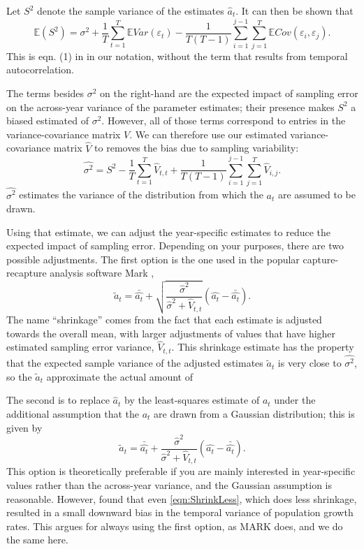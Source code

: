 \documentclass[11pt]{article}
\newcommand{\be}{\begin{equation}}
\newcommand{\ee}{\end{equation}}
\begin{document}
{Let $S^2$ denote the sample variance of the estimates $\hat{a}_t$. It can then be shown that 
\be
\mathbb{E}(S^2) = \sigma^2  + \frac{1}{T}\sum\limits_{t=1}^T \mathbb{E} Var(\varepsilon_t) 
- \frac{1}{T(T-1)}\sum\limits_{i=1}^{j-1} \sum\limits_{j=1}^T \mathbb{E}Cov(\varepsilon_i, \varepsilon_j). 
\label{eqn:biasTerms}
\ee
This is eqn. (1) in \citet{gould-nichols-1998} in our notation, without the term that 
results from temporal autocorrelation. 

The terms besides $\sigma^2$ on the right-hand are the expected impact of sampling error on the across-year variance
of the parameter estimates; their presence makes $S^2$ a biased estimated of $\sigma^2$. However,
all of those terms correspond to entries in the variance-covariance matrix $V$. We can therefore use our estimated
variance-covariance matrix $\hat{V}$ to removes the bias due to sampling variability: 
\be
\hat{\sigma^2}  = S^2 - \frac{1}{T}\sum\limits_{t=1}^T \hat{V}_{t,t} + 
\frac{1}{T(T-1)}\sum\limits_{i=1}^{j-1} \sum\limits_{j=1}^T \hat{V}_{i,j}. 
\label{eqn:hatSigma}
\ee
$\hat{\sigma^2}$ estimates the variance of the distribution from which the $a_t$ are assumed
to be drawn. 

Using that estimate, we can adjust the year-specific estimates to reduce the expected 
impact of sampling error. Depending on your purposes, there are two possible adjustments. 
The first option is the one used in the popular capture-recapture analysis 
software Mark \citet{cooch-white-2020}, 
\be
\widetilde{a}_t = \bar{\hat{a_t}} + \sqrt{\frac{\hat{\sigma}^2}{\hat{\sigma}^2 + \hat{V}_{t,t}}}\left (\hat{a_t} - \bar{\hat{a_t}} \right). 
\label{eqn:ShrinkLess}
\ee
The name ``shrinkage'' comes from the fact that each estimate is adjusted towards the overall mean, with 
larger adjustments of values that have higher estimated sampling error variance, $\hat{V}_{t,t}$. 
This shrinkage estimate has the property that the expected sample variance of the 
adjusted estimates $\widetilde{a}_t$ is very close to $\hat{\sigma^2}$, so the $\widetilde{a}_t$ approximate
the actual amount of 

The second is to replace $\hat{a}_t$ by the least-squares estimate of $a_t$ under the 
additional assumption that the $a_t$ are drawn from a Gaussian distribution; this is given by 
\be
\widetilde{a}_t = \bar{\hat{a_t}} + \frac{\hat{\sigma}^2}{\hat{\sigma}^2 + \hat{V}_{t,t}}\left (\hat{a_t} - \bar{\hat{a_t}} \right). 
\label{eqn:ShrinkMore}
\ee
This option is theoretically preferable if you are mainly interested in year-specific values rather than the across-year variance,
and the Gaussian assumption is reasonable. However, \citet{metcalf-etal-2015} found that even \eqref{eqn:ShrinkLess}, which does 
less shrinkage, resulted in a small downward bias in the temporal variance of population growth rates. This argues for  
always using the first option, as MARK does, and we do the same here. 

}
\end{document}
